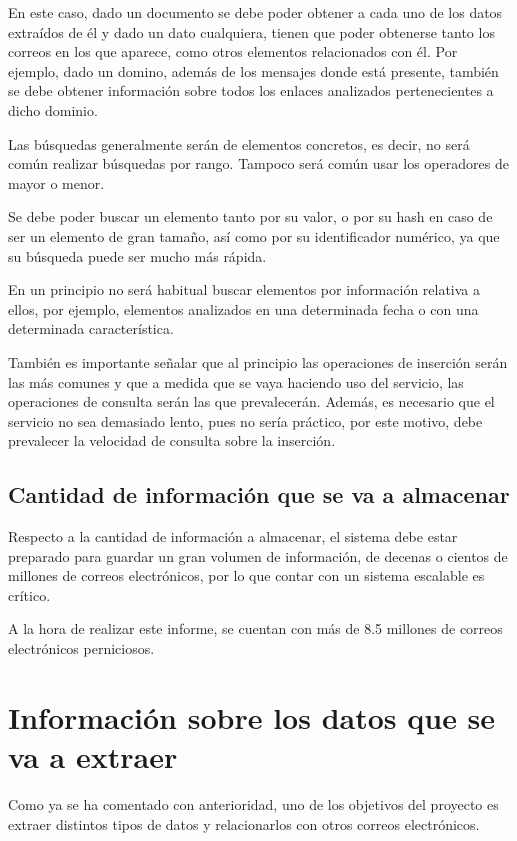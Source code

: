 En este caso, dado un documento se debe poder obtener a cada uno de los datos extraídos de él y dado un dato cualquiera, tienen que poder obtenerse tanto los correos en los que aparece, como otros elementos relacionados con él. Por ejemplo, dado un domino, además de los mensajes donde está presente, también se debe obtener información sobre todos los enlaces analizados pertenecientes a dicho dominio.

Las búsquedas generalmente serán de elementos concretos, es decir, no será común realizar búsquedas por rango. Tampoco será común usar los operadores de mayor o menor.

Se debe poder buscar un elemento tanto por su valor, o por su hash en caso de ser un elemento de gran tamaño, así como por su identificador numérico, ya que su búsqueda puede ser mucho más rápida. 

En un principio no será habitual buscar elementos por información relativa a ellos, por ejemplo, elementos analizados en una determinada fecha o con una determinada característica. 

También es importante señalar que al principio las operaciones de inserción serán las más comunes y que a medida que se vaya haciendo uso del servicio, las operaciones de consulta serán las que prevalecerán. Además, es necesario que el servicio no sea demasiado lento, pues no sería práctico, por este motivo, debe prevalecer la velocidad de consulta sobre la inserción. 

\subsection{Cantidad de información que se va a almacenar}
Respecto a la cantidad de información a almacenar, el sistema debe estar preparado para guardar un gran volumen de información, de decenas o cientos de millones de correos electrónicos, por lo que contar con un sistema escalable es crítico.  

A la hora de realizar este informe, se cuentan con más de 8.5 millones de correos electrónicos perniciosos. 


\section{Información sobre los datos que se va a extraer}
Como ya se ha comentado con anterioridad, uno de los objetivos del proyecto es extraer distintos tipos de datos y relacionarlos con otros correos electrónicos. 

